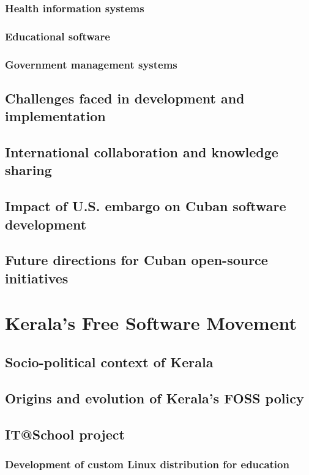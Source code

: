 \subsubsection{Health information systems}
\subsubsection{Educational software}
\subsubsection{Government management systems}
\subsection{Challenges faced in development and implementation}
\subsection{International collaboration and knowledge sharing}
\subsection{Impact of U.S. embargo on Cuban software development}
\subsection{Future directions for Cuban open-source initiatives}

\newpage

\section{Kerala's Free Software Movement}
\subsection{Socio-political context of Kerala}
\subsection{Origins and evolution of Kerala's FOSS policy}
\subsection{IT@School project}
\subsubsection{Development of custom Linux distribution for education}

